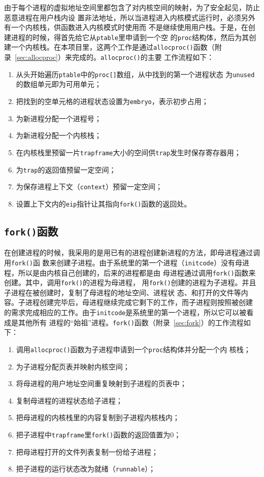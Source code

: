 \documentclass{swfcthesismscctex}
\begin{document}
由于每个进程的虚拟地址空间里都包含了对内核空间的映射，为了安全起见，防止恶意进程在用户栈内设
置非法地址，所以当进程进入内核模式运行时，必须另外有一个内核栈，供函数进入内核模式时使用而
不是继续使用用户栈。于是，在创建进程的时候，得首先给它从\texttt{ptable}里申请到一个空
的\texttt{proc}结构体，然后为其创建一个内核栈。在本项目里，这两个工作是通过\texttt{allocproc()}函数（附
录~\ref{sec:allocproc}）来完成的。\texttt{allocproc()}的主要
工作流程如下：
\begin{enumerate}
\item 从头开始遍历\texttt{ptable}中的\texttt{proc[]}数组，从中找到的第一个进程状态
  为\texttt{unused}的数组单元即为可用单元；
\item 把找到的空单元格的进程状态设置为\texttt{embryo}，表示初步占用；
\item 为新进程分配一个进程号；
\item 为新进程分配一个内核栈；
\item 在内核栈里预留一片\texttt{trapframe}大小的空间供\texttt{trap}发生时保存寄存器用；
\item 为\texttt{trap}的返回值预留一定空间；
\item 为保存进程上下文（\texttt{context}）预留一定空间；
\item 设置上下文内的\texttt{eip}指针让其指向\texttt{fork()}函数的返回处。
\end{enumerate}

\subsection{\texttt{fork()}函数}

在创建进程的时候，我采用的是用已有的进程创建新进程的方法，即母进程通过调用\texttt{fork()}函
数来创建子进程。由于系统里的第一个进程（\texttt{initcode}）没有母进程，所以是由内核自己创建的，后来的进程都是由
母进程通过调用\texttt{fork()}函数来创建。其中，调用\texttt{fork()}的进程为母进程，
用\texttt{fork()}创建的进程为子进程。并且子进程在被创建时，复制了母进程的地址空间、进程状
态、和打开的文件等内容。子进程创建完毕后，母进程继续完成它剩下的工作，而子进程则按照被创建
的需求完成相应的工作。由于\texttt{initcode}是系统里的第一个进程，所以它可以被看成是其他所有
进程的``始祖''进程。\texttt{fork()}函数（附录~\ref{sec:fork}）的工作流程如下：
\begin{enumerate}
\item 调用\texttt{allocproc()}函数为子进程申请到一个\texttt{proc}结构体并分配一个内
  核栈；
\item 为子进程分配页表并映射内核空间；
\item 将母进程的用户地址空间重复映射到子进程的页表中；
\item 复制母进程的进程状态给子进程；
\item 把母进程的内核栈里的内容复制到子进程内核栈内；
\item 把子进程中\texttt{trapframe}里\texttt{fork()}函数的返回值置为0；
\item 把母进程打开的文件列表复制一份给子进程；
\item 把子进程的运行状态改为就绪（\texttt{runnable}）；
\end{enumerate}
\end{document}
